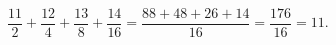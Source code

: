 $\dfrac{11}{2}+\dfrac{12}{4}+\dfrac{13}{8}+\dfrac{14}{16}=\dfrac{88+48+26+14}{16}=\dfrac{176}{16}=\boxed{11}$.
